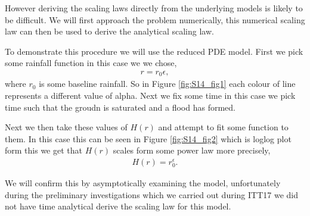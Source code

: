 \documentclass[11pt]{article}
\begin{document}
\noindent\begin{minipage}{0.53\textwidth}
    \qquad However deriving the scaling laws directly from the underlying models is likely to be difficult. We will first approach the problem numerically, this numerical scaling law can then be used to derive the analytical scaling law.
    
    \qquad To demonstrate this procedure we will use the reduced PDE model. First we pick some rainfall function in this case we we chose, \begin{align}
        r = r_0\epsilon,
    \end{align}
    where $r_0$ is some baseline rainfall. So in Figure \ref{fig:S14_fig1} each colour of line represents a different value of alpha. Next we fix some time in this case we pick time such that the groudn is saturated and a flood has formed. 
    
    \qquad Next we then take these values of $H(r)$ and attempt to fit some function to them. In this case this can be seen in Figure \ref{fig:S14_fig2} which is loglog plot form this we get that $H(r)$ scales form some power law more precisely, \begin{align}
    H(r)=r_0^{\epsilon}.
    \end{align}
    
    \qquad We will confirm this by asymptotically examining the model, unfortunately during the preliminary investigations which we carried out during ITT17 we did not have time analytical derive the scaling law for this model.
    \end{minipage}
\hspace{0.05\textwidth}
\end{document}
